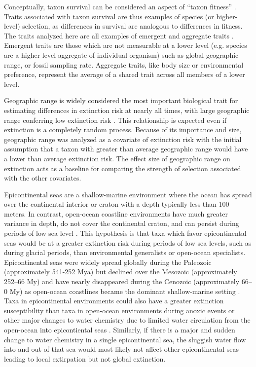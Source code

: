 \documentclass[11pt]{article}
\begin{document}
Conceptually, taxon survival can be considered an aspect of ``taxon fitness'' \citep{Cooper1984,Palmer2012}. Traits associated with taxon survival are thus examples of species (or higher-level) selection, as differences in survival are analogous to differences in fitness. The traits analyzed here are all examples of emergent and aggregate traits \citep{Jablonski2008a,Rabosky2010b}. Emergent traits are those which are not measurable at a lower level (e.g. species are a higher level aggregate of individual organism) such as global geographic range, or fossil sampling rate. Aggregate traits, like body size or environmental preference, represent the average of a shared trait across all members of a lower level.

Geographic range is widely considered the most important biological trait for estimating differences in extinction risk at nearly all times, with large geographic range conferring low extinction risk \citep{Jablonski1986,Jablonski1987,Jablonski2003,Payne2007,Jablonski2008a,Harnik2013,Finnegan2012a}. This relationship is expected even if extinction is a completely random process. Because of its importance and size, geographic range was analyzed as a covariate of extinction risk with the initial assumption that a taxon with greater than average geographic range would have a lower than average extinction risk. The effect size of geographic range on extinction acts as a baseline for comparing the strength of selection associated with the other covariates.

Epicontinental seas are a shallow-marine environment where the ocean has spread over the continental interior or craton with a depth typically less than 100 meters. In contrast, open-ocean coastline environments have much greater variance in depth, do not cover the continental craton, and can persist during periods of low sea level \citep{Miller2009a}. This hypothesis is that taxa which favor epicontinental seas would be at a greater extinction risk during periods of low sea levels, such as during glacial periods, than environmental generalists or open-ocean specialists. Epicontinental seas were widely spread globally during the Paleozoic (approximately 541-252 Mya) but declined over the Mesozoic (approximately 252--66 My) and have nearly disappeared during the Cenozoic (approximately 66--0 My) as open-ocean coastlines became the dominant shallow-marine setting \citep{Sheehan2001b,Peters2008,Miller2009a,Johnson1974}. Taxa in epicontinental environments could also have a greater extinction susceptibility than taxa in open-ocean environments during anoxic events or other major changes to water chemistry due to limited water circulation from the open-ocean into epicontiental seas \citep{Peters2007}. Similarly, if there is a major and sudden change to water chemistry in a single epicontinental sea, the sluggish water flow into and out of that sea would most likely not affect other epicontinental seas leading to local extirpation but not global extinction.
\end{document}
